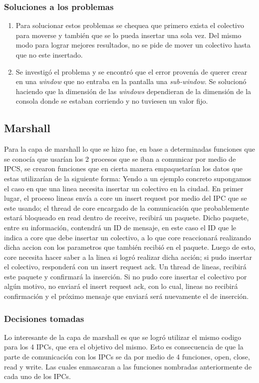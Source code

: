 \documentclass[a4paper,10pt]{elsart}
\begin{document}
\subsubsection{Soluciones a los problemas}
\begin{enumerate}
	\item Para solucionar estos problemas se chequea que primero exista el colectivo para moverse y tambi\'en que se lo pueda insertar una sola vez. Del mismo modo para lograr mejores resultados, no se pide de mover un colectivo hasta que no este insertado.
	\item Se investig\'o el problema y se encontr\'o que el error proven\'ia de querer crear en una \emph{window} que no entraba en la pantalla una \emph{sub-window}. Se solucion\'o haciendo que la dimensi\'on de las \emph{windows} dependieran de la dimensi\'on de la consola donde se estaban corriendo y no tuviesen un valor fijo.
\end{enumerate}

\subsection{Marshall}
Para la capa de marshall lo que se hizo fue, en base a determinadas funciones que se conoc\'ia que usar\'ian los 2 procesos que se iban a comunicar por medio de IPCS, se crearon funciones que en cierta manera empaquetar\'ian los datos que estas utilizar\'ian de la siguiente forma:
Yendo a un ejemplo concreto supongamos el caso en que una linea necesita insertar un colectivo en la ciudad.
En primer lugar, el proceso lineas env\'ia a core un insert request por medio del IPC que se este usando; el thread de core encargado de la comunicaci\'on que probablemente estar\'a bloqueado en read dentro de receive, recibir\'a un paquete.
Dicho paquete, entre su informaci\'on, contendr\'a un ID de mensaje, en este caso el ID que le indica a core que debe insertar un colectivo, a lo que core reaccionar\'a realizando dicha accion con los parametros que tambi\'en recibi\'o en el paquete.
Luego de esto, core necesita hacer saber a la linea si logr\'o realizar dicha acci\'on; si pudo insertar el colectivo, responder\'a con un insert request ack. Un thread de lineas, recibir\'a este paquete y confirmar\'a la inserci\'on.
Si no pudo core insertar el colectivo por alg\'un motivo, no enviar\'a el insert request ack, con lo cual, lineas no recibir\'a confirmaci\'on y el pr\'oximo mensaje que enviar\'a ser\'a nuevamente el de inserci\'on.

\subsubsection{Decisiones tomadas}
Lo interesante de la capa de marshall es que se logr\'o utilizar el mismo codigo para los 4 IPCs, que era el objetivo del mismo.
Esto es consecuencia de que la parte de comunicaci\'on con los IPCs se da por medio de 4 funciones, open, close, read y write.
Las cuales enmascaran a las funciones nombradas anteriormente de cada uno de los IPCs.
\end{document}
